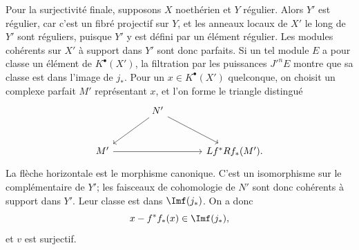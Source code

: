 \documentclass[11pt]{article}
\begin{document}
Pour la surjectivité finale, supposons \(X\) noethérien et \(Y\) régulier. Alors \(Y'\) est régulier, car c'est un fibré projectif sur \(Y\), et les anneaux locaux de \(X'\) le long de \(Y'\) sont réguliers, puisque \(Y'\) y est défini par un élément régulier. Les modules cohérents sur \(X'\) à support dans \(Y'\) sont donc parfaits. Si un tel module \(E\) a pour classe un élément de \(K^\bullet(X')\), la filtration par les puissances \(J'^nE\) montre que sa classe est dans l'image de \(j_*\). Pour un \(x\in K^\bullet(X')\) quelconque, on choisit un complexe parfait \(M'\) représentant \(x\), et l'on forme le triangle distingué
\[
\begin{tikzcd}[column sep=large,row sep=large]
& N' \arrow[dl] \arrow[dr] &\\
M' \arrow[rr] && Lf^*Rf_*(M').
\end{tikzcd}
\]
La flèche horizontale est le morphisme canonique. C'est un isomorphisme sur le complémentaire de \(Y'\); les faisceaux de cohomologie de \(N'\) sont donc cohérents à support dans \(Y'\). Leur classe est dans \(\Imf(j_*)\). On a donc
\[
x-f^*f_*(x)\in\Imf(j_*),
\]
et \(v\) est surjectif.
\end{document}
